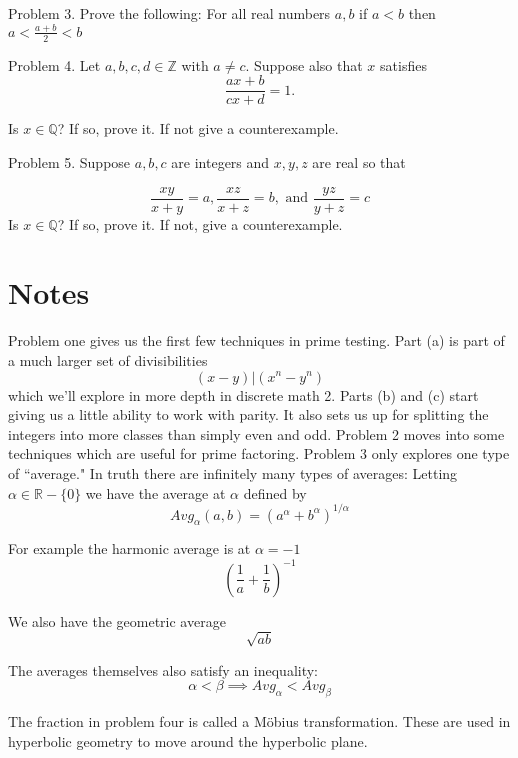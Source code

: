 \documentclass[16 pt]{amsart}
\theoremstyle{definition}
\theoremstyle{remark}
\numberwithin{equation}{subsection}
\newcommand{\R}{\mathbb{R}}
\newcommand{\Z}{\mathbb{Z}}
\newcommand{\Q}{\mathbb{Q}}
\begin{document}
\newpage

Problem 3. Prove the following: For all real numbers $a,b$ if $a<b$ then $a<\frac{a+b}{2}<b$

\vspace{1.5in}

Problem 4. Let $a,b,c,d\in\Z$ with $a \neq c$.  Suppose also that $x$ satisfies
\[
\frac{ax+b}{cx+d} = 1.
\]


Is $x\in\Q$?  If so, prove it.  If not give a counterexample.

\newpage

Problem 5. Suppose $a,b,c$ are integers and $x,y,z$ are real so that

\[
\frac{xy}{x+y} = a, \frac{xz}{x+z}=b, \text{ and } \frac{yz}{y+z}=c
\]
Is $x\in\Q$?  If so, prove it.  If not, give a counterexample.


\newpage

\section{Notes}

Problem one gives us the first few techniques in prime testing.  Part (a) is part of a much larger set of divisibilities 
\[
(x-y) | (x^n-y^n)
\]
which we'll explore in more depth in discrete math 2.  Parts (b) and (c) start giving us a little ability to work with parity.  It also sets us up for splitting the integers into more classes than simply even and odd.  Problem 2 moves into some techniques which are useful for prime factoring.  Problem 3 only explores one type of ``average."  In truth there are infinitely many types of averages: Letting $\alpha\in\R-\{0\}$ we have the average at $\alpha$ defined by
\[
Avg_{\alpha}(a,b) = (a^{\alpha}+b^{\alpha})^{1/\alpha}
\]

For example the harmonic average is at $\alpha=-1$
\[
\left(\frac{1}{a}+\frac{1}{b}\right)^{-1}
\]

We also have the geometric average
\[
\sqrt{ab}
\]

The averages themselves also satisfy an inequality:
\[
\alpha<\beta \implies Avg_{\alpha} < Avg_{\beta}
\]


The fraction in problem four is called a M\"{o}bius transformation.  These are used in hyperbolic geometry to move around the hyperbolic plane.  
\end{document}
